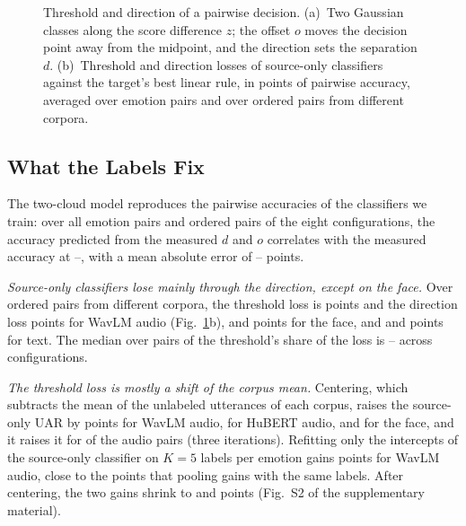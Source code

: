 \begin{figure}[b]
\centering
{}
\caption{Threshold and direction of a pairwise decision. (a)~Two Gaussian classes along the score difference $z$; the offset $o$ moves the decision point away from the midpoint, and the direction sets the separation $d$. (b)~Threshold and direction losses of source-only classifiers against the target's best linear rule, in points of pairwise accuracy, averaged over emotion pairs and over ordered pairs from different corpora.}
\label{fig:twocloud}
\end{figure}

\subsection{What the Labels Fix}
\label{sec:part1-fix}

The two-cloud model reproduces the pairwise accuracies of the classifiers we train: over all emotion pairs and ordered pairs of the eight configurations, the accuracy predicted from the measured $d$ and $o$ correlates with the measured accuracy at --, with a mean absolute error of -- points.

\emph{Source-only classifiers lose mainly through the direction, except on the face.}
Over ordered pairs from different corpora, the threshold loss is  points and the direction loss  points for WavLM audio (Fig.~\ref{fig:twocloud}b),  and  points for the face, and  and  points for text.
The median over pairs of the threshold's share of the loss is -- across configurations.

\emph{The threshold loss is mostly a shift of the corpus mean.}
Centering, which subtracts the mean of the unlabeled utterances of each corpus, raises the source-only UAR by  points for WavLM audio,  for HuBERT audio, and  for the face, and it raises it for  of the  audio pairs (three iterations).
Refitting only the intercepts of the source-only classifier on $K=5$ labels per emotion gains  points for WavLM audio, close to the  points that pooling gains with the same labels.
After centering, the two gains shrink to  and  points (Fig.~S2 of the supplementary material).

